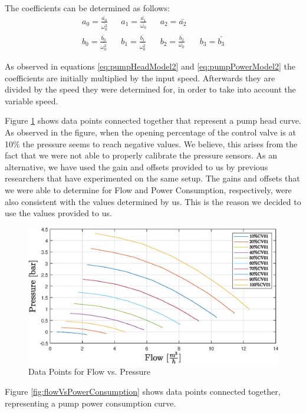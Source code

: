 \newpage
The coefficients can be determined as follows:
\begin{align*}
	a_0 = \frac{\bar{a_0}}{\bar{\omega_0^2}} && a_1 = \frac{\bar{a_1}}{\bar{\omega_0}} && a_2 = \bar{a_2} \\
	b_0 = \frac{\bar{b_0}}{\bar{\omega_0^3}} && b_1 = \frac{\bar{b_1}}{\bar{\omega_0^2}} && b_2 = \frac{\bar{b_2}}{\omega_0} && b_3 = \bar{b_3}
\end{align*}

As observed in equations \ref{eq:pumpHeadModel2} and \ref{eq:pumpPowerModel2} the coefficients are
initially multiplied by the input speed. Afterwards they are divided by the
speed they were determined for, in order to take into account the variable speed.

Figure \ref{fig:flowVsPressure} shows data points connected together that represent 
a pump head curve. As observed in the figure, when the opening percentage of the control valve is at
10\% the pressure seems to reach negative values. We believe, this arises from the fact that we were not 
able to properly calibrate the pressure sensors. As an alternative, we have used the gain and offsets
provided to us by previous researchers that have experimented on the same setup. The gains and offsets
that we were able to determine for Flow and Power Consumption, respectively, were also consistent with
the values determined by us. This is the reason we decided to use the values provided to us.

\begin{figure}[h]
	\centering
	\includegraphics[width=1\textwidth]{figures/05mathematicalModelling/flowVsPressureRun34.eps}
	\caption{Data Points for Flow vs. Pressure}
	\label{fig:flowVsPressure}
\end{figure}

\newpage
Figure \ref{fig:flowVsPowerConsumption} shows data points connected together, representing a pump
power consumption curve.

